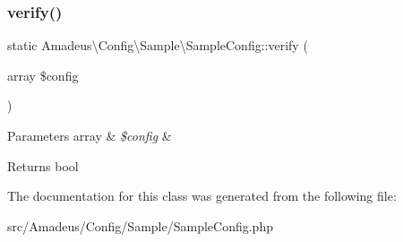 \subsubsection{\texorpdfstring{verify()}{verify()}}
{\footnotesize\ttfamily static Amadeus\textbackslash{}\+Config\textbackslash{}\+Sample\textbackslash{}\+Sample\+Config\+::verify (\begin{DoxyParamCaption}\item[{array}]{\$config }\end{DoxyParamCaption})\hspace{0.3cm}{\ttfamily [static]}}


\begin{DoxyParams}[1]{Parameters}
array & {\em \$config} & \\
\hline
\end{DoxyParams}
\begin{DoxyReturn}{Returns}
bool 
\end{DoxyReturn}


The documentation for this class was generated from the following file\+:\begin{DoxyCompactItemize}
\item 
src/\+Amadeus/\+Config/\+Sample/Sample\+Config.\+php\end{DoxyCompactItemize}

